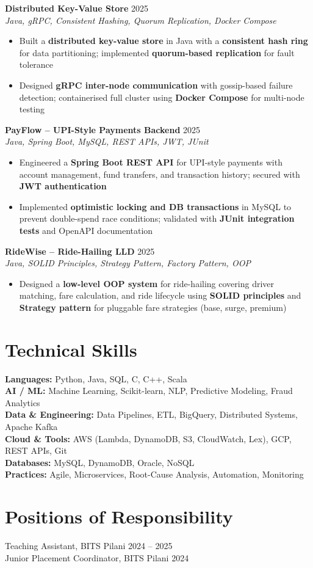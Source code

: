 \documentclass[10.5pt]{article}
\begin{document}
\vspace{-2pt}
\textbf{Distributed Key-Value Store} \hfill 2025 \\
\textit{Java, gRPC, Consistent Hashing, Quorum Replication, Docker Compose}
\begin{itemize}
  \item Built a \textbf{distributed key-value store} in Java with a \textbf{consistent hash ring}
        for data partitioning; implemented \textbf{quorum-based replication} for fault tolerance
  \item Designed \textbf{gRPC inter-node communication} with gossip-based failure detection;
        containerised full cluster using \textbf{Docker Compose} for multi-node testing
\end{itemize}

\vspace{-2pt}
\textbf{PayFlow -- UPI-Style Payments Backend} \hfill 2025 \\
\textit{Java, Spring Boot, MySQL, REST APIs, JWT, JUnit}
\begin{itemize}
  \item Engineered a \textbf{Spring Boot REST API} for UPI-style payments with account management,
        fund transfers, and transaction history; secured with \textbf{JWT authentication}
  \item Implemented \textbf{optimistic locking and DB transactions} in MySQL to prevent double-spend
        race conditions; validated with \textbf{JUnit integration tests} and OpenAPI documentation
\end{itemize}

\vspace{-2pt}
\textbf{RideWise -- Ride-Hailing LLD} \hfill 2025 \\
\textit{Java, SOLID Principles, Strategy Pattern, Factory Pattern, OOP}
\begin{itemize}
  \item Designed a \textbf{low-level OOP system} for ride-hailing covering driver matching, fare
        calculation, and ride lifecycle using \textbf{SOLID principles} and \textbf{Strategy pattern}
        for pluggable fare strategies (base, surge, premium)
\end{itemize}
\vspace{-6pt}

\section{Technical Skills}
\textbf{Languages:} Python, Java, SQL, C, C++, Scala \\
\textbf{AI / ML:} Machine Learning, Scikit-learn, NLP, Predictive Modeling, Fraud Analytics \\
\textbf{Data \& Engineering:} Data Pipelines, ETL, BigQuery, Distributed Systems, Apache Kafka \\
\textbf{Cloud \& Tools:} AWS (Lambda, DynamoDB, S3, CloudWatch, Lex), GCP, REST APIs, Git \\
\textbf{Databases:} MySQL, DynamoDB, Oracle, NoSQL \\
\textbf{Practices:} Agile, Microservices, Root-Cause Analysis, Automation, Monitoring
\vspace{-6pt}

\section{Positions of Responsibility}
Teaching Assistant, BITS Pilani \hfill 2024 -- 2025 \\
Junior Placement Coordinator, BITS Pilani \hfill 2024
\end{document}
